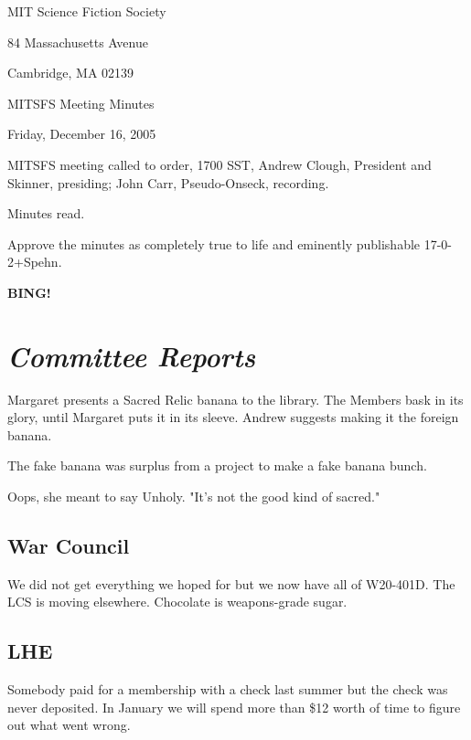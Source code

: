 \documentclass[10pt]{article}
\newcommand{\bing}{{\bf BING!} }
\newcommand{\goto}[1]{\bing \vskip 12pt \section*{{\em{#1}}}}
\begin{document}
\begin{center}

MIT Science Fiction Society

84 Massachusetts Avenue

Cambridge, MA 02139

\vspace{12pt}

MITSFS Meeting Minutes

Friday, December 16, 2005

\end{center}

\vspace{18pt}

\setlength{\parskip}{6pt}

\noindent
MITSFS meeting called to order, 1700 SST, Andrew Clough, President and 
Skinner, presiding; John Carr, Pseudo-Onseck, recording.

Minutes read.

Approve the minutes as completely true to life and eminently publishable
17-0-2+Spehn.

\goto{Committee Reports}

Margaret presents a Sacred Relic banana to the library.
The Members bask in its glory, until Margaret puts it in
its sleeve.  Andrew suggests making it the foreign banana.

The fake banana was surplus from a project to make a fake
banana bunch.

Oops, she meant to say Unholy.  "It's not the good kind of sacred."

\subsection*{War Council}

We did not get everything we hoped for but we now have all
of W20-401D.  The LCS is moving elsewhere.
Chocolate is weapons-grade sugar.


\subsection*{LHE}

Somebody paid for a membership with a check last summer but
the check was never deposited.  In January we will spend more
than \$12 worth of time to figure out what went wrong.
\end{document}
